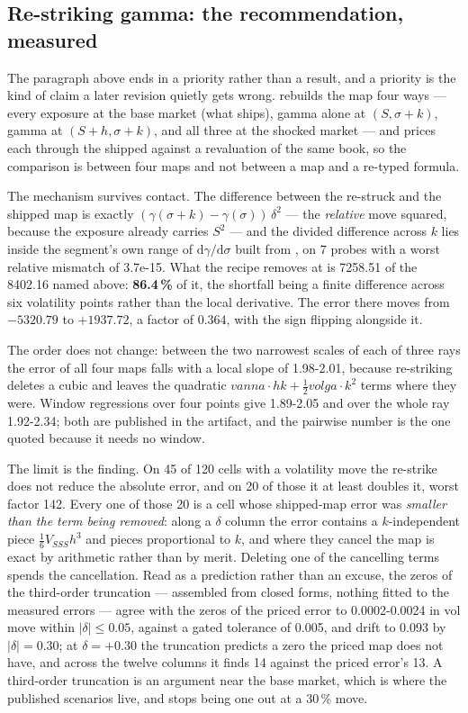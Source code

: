\documentclass[11pt,a4paper]{article}
\begin{document}
\subsection{Re-striking gamma: the recommendation, measured}
\label{sec:restrike}
The paragraph above ends in a priority rather than a result, and a priority is the kind of claim a
later revision quietly gets wrong.  rebuilds the
map four
ways --- every exposure at the base market (what ships), gamma alone at $(S, \sigma{+}k)$, gamma at
$(S{+}h, \sigma{+}k)$, and all three at the shocked market --- and prices each through the shipped
 against a revaluation of the same book, so the comparison is between four maps and
not between a map and a re-typed formula.

The mechanism survives contact. The difference between the re-struck and the shipped map is exactly
$(\gamma(\sigma{+}k) - \gamma(\sigma))\,\delta^2$ --- the \emph{relative} move squared, because the
exposure already carries $S^2$ --- and the divided difference across $k$ lies inside the segment's own
range of $\mathrm{d}\gamma/\mathrm{d}\sigma$ built from ,
on $7$ probes with a worst relative mismatch of 3.7e-15. What the recipe removes at
 is 7258.51 of the 8402.16 named above: \textbf{86.4\,\%} of it, the shortfall being a
finite difference across six volatility points rather than the local derivative. The error there moves
from $-5320.79$ to $+1937.72$, a factor of $0.364$, with the sign flipping alongside it.

The order does not change: between the two narrowest scales of each of three rays the error of all four
maps falls with a local slope of 1.98-2.01, because re-striking deletes a cubic and leaves the
quadratic $vanna \cdot hk + \tfrac12 volga \cdot k^2$ terms where they were. Window regressions over
four points give 1.89-2.05 and over the whole ray 1.92-2.34; both are published in the artifact, and
the pairwise number is the one quoted because it needs no window.

The limit is the finding. On 45 of 120 cells with a volatility move the re-strike does not reduce the
absolute error, and on 20 of those it at least doubles it, worst factor 142. Every one of those 20 is a
cell whose shipped-map error was \emph{smaller than the term being removed}: along a $\delta$ column the
error contains a $k$-independent piece $\tfrac16 V_{SSS}h^3$ and pieces proportional to $k$, and where
they cancel the map is exact by arithmetic rather than by merit. Deleting one of the cancelling terms
spends the cancellation. Read as a prediction rather than an excuse, the zeros of the third-order
truncation --- assembled from closed forms, nothing fitted to the measured errors --- agree with the
zeros of the priced error to 0.0002-0.0024 in vol move within $|\delta| \le 0.05$, against a gated
tolerance of 0.005, and drift to 0.093 by $|\delta| = 0.30$; at $\delta = +0.30$ the truncation
predicts a zero the priced map does not have, and across the twelve columns it finds 14 against the
priced error's 13. A third-order truncation is an argument near the base market, which is where the
published scenarios live, and stops being one out at a 30\,\% move.
\end{document}

